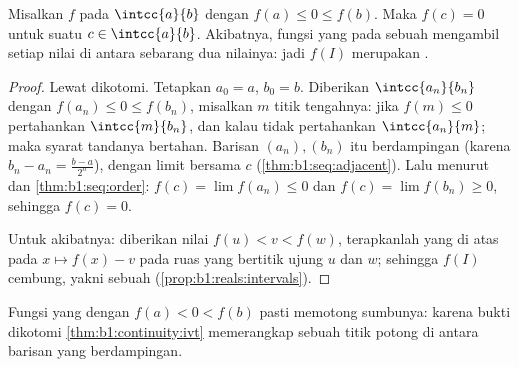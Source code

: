 \begin{theorem}\label{thm:b1:continuity:ivt}
Misalkan $f$  pada $\intcc{a}{b}$ dengan $f(a) \leq 0 \leq
f(b)$. Maka $f(c) = 0$ untuk suatu $c \in \intcc{a}{b}$.
Akibatnya, fungsi yang  pada sebuah  mengambil setiap nilai
di antara sebarang dua nilainya: jadi $f(I)$ merupakan
.
\end{theorem}

\begin{proof}
Lewat dikotomi. Tetapkan $a_0 = a$, $b_0 = b$. Diberikan $\intcc{a_n}{b_n}$ dengan
$f(a_n) \leq 0 \leq f(b_n)$, misalkan $m$ titik tengahnya: jika $f(m) \leq
0$ pertahankan $\intcc{m}{b_n}$, dan kalau tidak pertahankan $\intcc{a_n}{m}$; maka syarat
tandanya bertahan. Barisan $(a_n), (b_n)$ itu berdampingan (karena $b_n -
a_n = \frac{b-a}{2^n}$), dengan limit bersama $c$
(\cref{thm:b1:seq:adjacent}). Lalu menurut  dan
\cref{thm:b1:seq:order}: $f(c) = \lim f(a_n) \leq 0$ dan $f(c) =
\lim f(b_n) \geq 0$, sehingga $f(c) = 0$.

Untuk akibatnya: diberikan nilai $f(u) < v < f(w)$, terapkanlah yang di atas
pada $x \mapsto f(x) - v$ pada ruas yang bertitik ujung $u$ dan $w$;
sehingga $f(I)$ cembung, yakni sebuah 
(\cref{prop:b1:reals:intervals}).
\end{proof}

\begin{omfigure}

{\small Fungsi yang  dengan $f(a) < 0 < f(b)$ pasti memotong
sumbunya: karena bukti dikotomi \cref{thm:b1:continuity:ivt} memerangkap sebuah
titik potong di antara barisan yang berdampingan.}
\end{omfigure}

